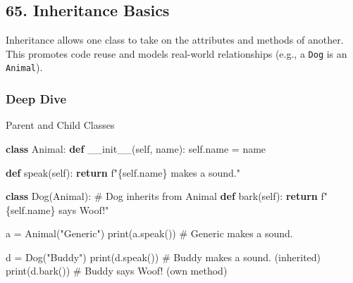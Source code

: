 \documentclass[
  letterpaper,
  DIV=11,
  numbers=noendperiod]{scrreprt}
\newenvironment{Shaded}{\begin{snugshade}}{\end{snugshade}}
\newcommand{\BuiltInTok}[1]{\textcolor[rgb]{0.00,0.23,0.31}{#1}}
\newcommand{\CommentTok}[1]{\textcolor[rgb]{0.37,0.37,0.37}{#1}}
\newcommand{\ControlFlowTok}[1]{\textcolor[rgb]{0.00,0.23,0.31}{\textbf{#1}}}
\newcommand{\FunctionTok}[1]{\textcolor[rgb]{0.28,0.35,0.67}{#1}}
\newcommand{\KeywordTok}[1]{\textcolor[rgb]{0.00,0.23,0.31}{\textbf{#1}}}
\newcommand{\NormalTok}[1]{\textcolor[rgb]{0.00,0.23,0.31}{#1}}
\newcommand{\OperatorTok}[1]{\textcolor[rgb]{0.37,0.37,0.37}{#1}}
\newcommand{\SpecialCharTok}[1]{\textcolor[rgb]{0.37,0.37,0.37}{#1}}
\newcommand{\SpecialStringTok}[1]{\textcolor[rgb]{0.13,0.47,0.30}{#1}}
\newcommand{\StringTok}[1]{\textcolor[rgb]{0.13,0.47,0.30}{#1}}
\newcommand{\VariableTok}[1]{\textcolor[rgb]{0.07,0.07,0.07}{#1}}
\begin{document}
\subsection{65. Inheritance Basics}\label{inheritance-basics}

Inheritance allows one class to take on the attributes and methods of
another. This promotes code reuse and models real-world relationships
(e.g., a \texttt{Dog} is an \texttt{Animal}).

\subsubsection{Deep Dive}\label{deep-dive-64}

Parent and Child Classes

\begin{Shaded}
\begin{Highlighting}[]
\KeywordTok{class}\NormalTok{ Animal:}
    \KeywordTok{def} \FunctionTok{\_\_init\_\_}\NormalTok{(}\VariableTok{self}\NormalTok{, name):}
        \VariableTok{self}\NormalTok{.name }\OperatorTok{=}\NormalTok{ name}
    
    \KeywordTok{def}\NormalTok{ speak(}\VariableTok{self}\NormalTok{):}
        \ControlFlowTok{return} \SpecialStringTok{f"}\SpecialCharTok{\{}\VariableTok{self}\SpecialCharTok{.}\NormalTok{name}\SpecialCharTok{\}}\SpecialStringTok{ makes a sound."}

\KeywordTok{class}\NormalTok{ Dog(Animal):   }\CommentTok{\# Dog inherits from Animal}
    \KeywordTok{def}\NormalTok{ bark(}\VariableTok{self}\NormalTok{):}
        \ControlFlowTok{return} \SpecialStringTok{f"}\SpecialCharTok{\{}\VariableTok{self}\SpecialCharTok{.}\NormalTok{name}\SpecialCharTok{\}}\SpecialStringTok{ says Woof!"}
\end{Highlighting}
\end{Shaded}

\begin{Shaded}
\begin{Highlighting}[]
\NormalTok{a }\OperatorTok{=}\NormalTok{ Animal(}\StringTok{"Generic"}\NormalTok{)}
\BuiltInTok{print}\NormalTok{(a.speak())     }\CommentTok{\# Generic makes a sound.}

\NormalTok{d }\OperatorTok{=}\NormalTok{ Dog(}\StringTok{"Buddy"}\NormalTok{)}
\BuiltInTok{print}\NormalTok{(d.speak())     }\CommentTok{\# Buddy makes a sound. (inherited)}
\BuiltInTok{print}\NormalTok{(d.bark())      }\CommentTok{\# Buddy says Woof! (own method)}
\end{Highlighting}
\end{Shaded}
\end{document}
